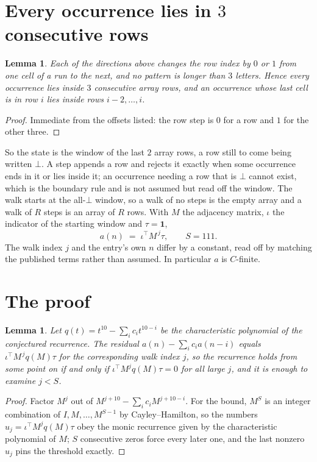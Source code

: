\documentclass[11pt,a4paper]{article}
\theoremstyle{plain}
\newtheorem{lemma}[theorem]{Lemma}
\theoremstyle{definition}
\begin{document}
\section{Every occurrence lies in $3$ consecutive rows}

\begin{lemma}\label{lem:win}
Each of the directions above changes the row index by $0$ or $1$ from one cell of a run to the
next, and no pattern is longer than $3$ letters. Hence every occurrence lies inside $3$
consecutive array rows, and an occurrence whose last cell is in row $i$ lies inside rows
$i-2,\dots,i$.
\end{lemma}

\begin{proof}
Immediate from the offsets listed: the row step is $0$ for a row and $1$ for the other three.
\end{proof}

So the state is the window of the last $2$ array rows, a row still to come being written
$\bot$. A step appends a row and rejects it exactly when some occurrence ends in it or lies
inside it; an occurrence needing a row that is $\bot$ cannot exist, which is the boundary rule
and is not assumed but read off the window. The walk starts at the all-$\bot$ window, so a walk
of no steps is the empty array and a walk of $R$ steps is an array of $R$ rows. With $M$ the
adjacency matrix, $\iota$ the indicator of the starting window and $\tau=\mathbf{1}$,
\[
a(n)\;=\;\iota^{\!\top}M^{\,j}\tau ,\qquad S=111.
\]
The walk index $j$ and the entry's own $n$ differ by a constant, read off by matching the
published terms rather than assumed. In particular $a$ is $C$-finite.

\section{The proof}

\begin{lemma}\label{lem:crit}
Let $q(t)=t^{10}-\sum_i c_it^{10-i}$ be the characteristic polynomial of the
conjectured recurrence. The residual $a(n)-\sum_ic_ia(n-i)$ equals
$\iota^{\!\top}M^{\,j}q(M)\tau$ for the corresponding walk index $j$, so the recurrence
holds from some point on if and only if $\iota^{\!\top}M^{j}q(M)\tau=0$ for all large $j$,
and it is enough to examine $j<S$.
\end{lemma}

\begin{proof}
Factor $M^{j}$ out of $M^{j+10}-\sum_ic_iM^{j+10-i}$. For the bound, $M^{S}$
is an integer combination of $I,M,\dots,M^{S-1}$ by Cayley--Hamilton, so the numbers
$u_j=\iota^{\!\top}M^{j}q(M)\tau$ obey the monic recurrence given by the characteristic
polynomial of $M$; $S$ consecutive zeros force every later one, and the last nonzero $u_j$
pins the threshold exactly.
\end{proof}
\end{document}
